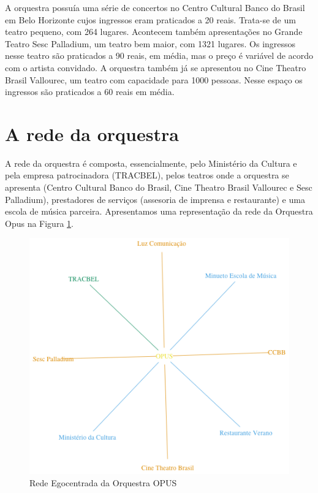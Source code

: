 \documentclass[a4paper, 12pt, openright, oneside, german, french, english, brazil]{abntex2}
\begin{document}
	A orquestra possuía uma série de concertos no Centro Cultural Banco do Brasil em Belo Horizonte cujos ingressos eram praticados a 20 reais. Trata-se de um teatro pequeno, com 264 lugares. Acontecem também apresentações no Grande Teatro Sesc Palladium, um teatro bem maior, com 1321 lugares. Os ingressos nesse teatro são praticados a 90 reais, em média, mas o preço é variável de acordo com o artista convidado. A orquestra também já se apresentou no Cine Theatro Brasil Vallourec, um teatro com capacidade para 1000 pessoas. Nesse espaço os ingressos são praticados a 60 reais em média.
	
	\section{A rede da orquestra}
	
	A rede da orquestra é composta, essencialmente, pelo Ministério da Cultura e pela empresa patrocinadora (TRACBEL), pelos teatros onde a orquestra se apresenta (Centro Cultural Banco do Brasil, Cine Theatro Brasil Vallourec e Sesc Palladium), prestadores de serviços (assesoria de imprensa e restaurante) e uma escola de música parceira. Apresentamos uma representação da rede da Orquestra Opus na Figura \ref{rede-opus}.
	
	\begin{figure}[!h]
		\centering
		\caption{Rede Egocentrada da Orquestra OPUS}
		\label{rede-opus}
		\includegraphics[scale=.7]{rede_opus.png}
	\end{figure}
	
\end{document}
